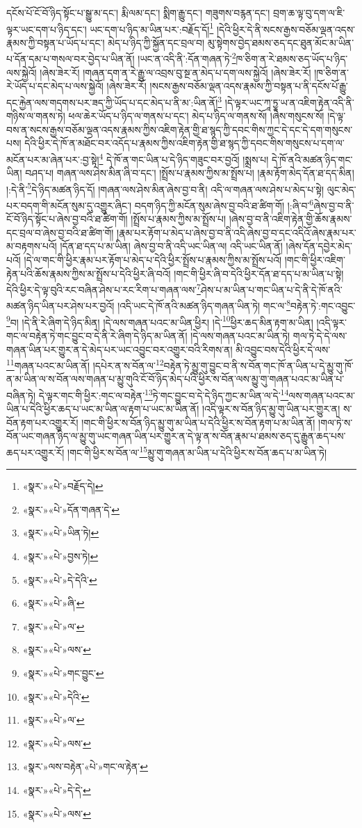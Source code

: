 དངོས་པོ་ངོ་བོ་ཉིད་སྟོང་པ་སྒྱུ་མ་དང་། རྨི་ལམ་དང་། སྨིག་རྒྱུ་དང་། གཟུགས་བརྙན་དང་། བྲག་ཆ་ལྟ་བུ་དག་ལ་ཇི་ལྟར་ཡང་དག་པ་ཉིད་དང་། ཡང་དག་པ་ཉིད་མ་ཡིན་པར་:བརྗོད་དོ།\footnote{«སྣར་»«པེ་»བརྗོད་དེ།} །དེའི་ཕྱིར་དེ་ནི་སངས་རྒྱས་བཅོམ་ལྡན་འདས་རྣམས་ཀྱི་བསྟན་པ་ཡོད་པ་དང་། མེད་པ་ཉིད་ཀྱི་སྐྱོན་དང་བྲལ་བ། མུ་སྟེགས་བྱེད་ཐམས་ཅད་དང་ཐུན་མོང་མ་ཡིན་པ་དོན་དམ་པ་གསལ་བར་བྱེད་པ་ཡིན་ནོ། །ཡང་ན་འདི་ནི་:དོན་གཞན་ཏེ་\footnote{«སྣར་»«པེ་»དོན་གཞན་དེ་}ཁ་ཅིག་ན་རེ་ཐམས་ཅད་ཡོད་པ་ཉིད་ལས་སྐྱེའོ། །ཞེས་ཟེར་རོ། །གཞན་དག་ན་རེ་རྒྱུ་ལ་འབྲས་བུ་སྔ་ན་མེད་པ་དག་ལས་སྐྱེའོ། །ཞེས་ཟེར་རོ། །ཁ་ཅིག་ན་རེ་ཡོད་པ་དང་མེད་པ་ལས་སྐྱེའོ། །ཞེས་ཟེར་རོ། །སངས་རྒྱས་བཅོམ་ལྡན་འདས་རྣམས་ཀྱི་བསྟན་པ་ནི་དངོས་པོ་རྒྱུ་དང་རྐྱེན་ལས་གདགས་པར་ཟད་ཀྱི་ཡོད་པ་དང་མེད་པ་ནི་མ་:ཡིན་ནོ།\footnote{«སྣར་»«པེ་»ཡིན་ཏེ།} །དེ་ལྟར་ཡང་ཀཱ་ཏྱཱ་ཡ་ན་འཇིག་རྟེན་འདི་ནི་གཉིས་ལ་གནས་ཏེ། ཕལ་ཆེར་ཡོད་པ་ཉིད་ལ་གནས་པ་དང་། མེད་པ་ཉིད་ལ་གནས་སོ། །ཞེས་གསུངས་སོ། །དེ་ལྟ་བས་ན་སངས་རྒྱས་བཅོམ་ལྡན་འདས་རྣམས་ཀྱིས་འཇིག་རྟེན་གྱི་ཐ་སྙད་ཀྱི་དབང་གིས་ཀྱང་དེ་དང་དེ་དག་གསུངས་པས། དེའི་ཕྱིར་དེ་ཁོ་ན་མཐོང་བར་འདོད་པ་རྣམས་ཀྱིས་འཇིག་རྟེན་གྱི་ཐ་སྙད་ཀྱི་དབང་གིས་གསུངས་པ་དག་ལ་མངོན་པར་མ་ཞེན་པར་:བྱ་སྟེ།\footnote{«སྣར་»«པེ་»བྱས་ཏེ།} དེ་ཁོ་ན་གང་ཡིན་པ་དེ་ཉིད་གཟུང་བར་བྱའོ། །སྨྲས་པ། དེ་ཁོ་ནའི་མཚན་ཉིད་གང་ཡིན། བཤད་པ། གཞན་ལས་ཤེས་མིན་ཞི་བ་དང་། །སྤྲོས་པ་རྣམས་ཀྱིས་མ་སྤྲོས་པ། །རྣམ་རྟོག་མེད་དོན་ཐ་དད་མིན། །:དེ་ནི་\footnote{«སྣར་»«པེ་»དེ་དེའི་}དེ་ཉིད་མཚན་ཉིད་དོ། །གཞན་ལས་ཤེས་མིན་ཞེས་བྱ་བ་ནི། འདི་ལ་གཞན་ལས་ཤེས་པ་མེད་པ་སྟེ། ལུང་མེད་པར་བདག་གི་མངོན་སུམ་དུ་འགྱུར་ཞིང་། བདག་ཉིད་ཀྱི་མངོན་སུམ་ཞེས་བྱ་བའི་ཐ་ཚིག་གོ། །:ཞི་བ་\footnote{«སྣར་»«པེ་»ཞི་}ཞེས་བྱ་བ་ནི་ངོ་བོ་ཉིད་སྟོང་པ་ཞེས་བྱ་བའི་ཐ་ཚིག་གོ། །སྤྲོས་པ་རྣམས་ཀྱིས་མ་སྤྲོས་པ། །ཞེས་བྱ་བ་ནི་འཇིག་རྟེན་གྱི་ཆོས་རྣམས་དང་བྲལ་བ་ཞེས་བྱ་བའི་ཐ་ཚིག་གོ། །རྣམ་པར་རྟོག་པ་མེད་པ་ཞེས་བྱ་བ་ནི་འདི་ཞེས་བྱ་བ་དང་འདིའོ་ཞེས་རྣམ་པར་མ་བརྟགས་པའོ། །དོན་ཐ་དད་པ་མ་ཡིན། ཞེས་བྱ་བ་ནི་འདི་ཡང་ཡིན་ལ། འདི་ཡང་ཡིན་ནོ། །ཞེས་དོན་དབྱེར་མེད་པའོ། །དེ་ལ་གང་གི་ཕྱིར་རྣམ་པར་རྟོག་པ་མེད་པ་དེའི་ཕྱིར་སྤྲོས་པ་རྣམས་ཀྱིས་མ་སྤྲོས་པའོ། །གང་གི་ཕྱིར་འཇིག་རྟེན་པའི་ཆོས་རྣམས་ཀྱིས་མ་སྤྲོས་པ་དེའི་ཕྱིར་ཞི་བའོ། །གང་གི་ཕྱིར་ཞི་བ་དེའི་ཕྱིར་དོན་ཐ་དད་པ་མ་ཡིན་པ་སྟེ། དེའི་ཕྱིར་དེ་ལྟ་བུའི་རང་བཞིན་ཤེས་པ་རང་རིག་པ་གཞན་ལས་\footnote{«སྣར་»«པེ་»ལ་}ཤེས་པ་མ་ཡིན་པ་གང་ཡིན་པ་དེ་ནི་དེ་ཁོ་ནའི་མཚན་ཉིད་ཡིན་པར་ཤེས་པར་བྱའོ། །འདི་ཡང་དེ་ཁོ་ནའི་མཚན་ཉིད་གཞན་ཡིན་ཏེ། གང་ལ་\footnote{«སྣར་»«པེ་»ལས་}བརྟེན་ཏེ་:གང་འབྱུང་\footnote{«སྣར་»«པེ་»གང་བྱུང་}བ། །དེ་ནི་རེ་ཞིག་དེ་ཉིད་མིན། །དེ་ལས་གཞན་པའང་མ་ཡིན་ཕྱིར། །དེ་\footnote{«སྣར་»«པེ་»དེའི་}ཕྱིར་ཆད་མིན་རྟག་མ་ཡིན། །འདི་ལྟར་གང་ལ་བརྟེན་ཏེ་གང་བྱུང་བ་དེ་ནི་རེ་ཞིག་དེ་ཉིད་མ་ཡིན་ནོ། །དེ་ལས་གཞན་པའང་མ་ཡིན་ཏེ། གལ་ཏེ་དེ་དེ་ལས་གཞན་ཡིན་པར་གྱུར་ན་དེ་མེད་པར་ཡང་འབྱུང་བར་འགྱུར་བའི་རིགས་ན། མི་འབྱུང་བས་དེའི་ཕྱིར་དེ་ལས་\footnote{«སྣར་»«པེ་»ལ་}གཞན་པའང་མ་ཡིན་ནོ། །དཔེར་ན་ས་བོན་ལ་\footnote{«སྣར་»«པེ་»ལས་}བརྟེན་ཏེ་མྱུ་གུ་བྱུང་བ་ནི་ས་བོན་གང་ཁོ་ན་ཡིན་པ་དེ་མྱུ་གུ་ཁོ་ན་མ་ཡིན་ལ་ས་བོན་ལས་གཞན་པ་མྱུ་གུའི་ངོ་བོ་ཉིད་མེད་པའི་ཕྱིར་ས་བོན་ལས་མྱུ་གུ་གཞན་པའང་མ་ཡིན་པ་བཞིན་ཏེ། དེ་ལྟར་གང་གི་ཕྱིར་:གང་ལ་བརྟེན་\footnote{«སྣར་»ལས་བརྟེན་«པེ་»གང་ལ་རྟེན་}ཏེ་གང་བྱུང་བ་དེ་དེ་ཉིད་ཀྱང་མ་ཡིན་ལ་དེ་\footnote{«སྣར་»«པེ་»དེ་དེ་}ལས་གཞན་པའང་མ་ཡིན་པ་དེའི་ཕྱིར་ཆད་པ་ཡང་མ་ཡིན་ལ་རྟག་པ་ཡང་མ་ཡིན་ནོ། །འདི་ལྟར་ས་བོན་ཉིད་མྱུ་གུ་ཡིན་པར་གྱུར་ན། ས་བོན་རྟག་པར་འགྱུར་རོ། །གང་གི་ཕྱིར་ས་བོན་ཉིད་མྱུ་གུ་མ་ཡིན་པ་དེའི་ཕྱིར་ས་བོན་རྟག་པ་མ་ཡིན་ནོ། །གལ་ཏེ་ས་བོན་ཡང་གཞན་ཉིད་ལ་མྱུ་གུ་ཡང་གཞན་ཡིན་པར་གྱུར་ན་དེ་ལྟ་ན་ས་བོན་རྣམ་པ་ཐམས་ཅད་དུ་རྒྱུན་ཆད་པས་ཆད་པར་འགྱུར་རོ། །གང་གི་ཕྱིར་ས་བོན་ལ་\footnote{«སྣར་»«པེ་»ལས་}མྱུ་གུ་གཞན་མ་ཡིན་པ་དེའི་ཕྱིར་ས་བོན་ཆད་པ་མ་ཡིན་ཏེ། 